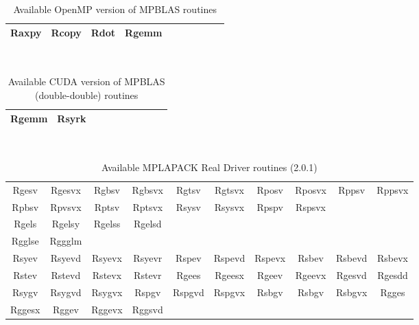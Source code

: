\documentclass[12pt]{article}
\begin{document}
\begin{table}
\caption{Available OpenMP version of MPBLAS routines}\label{mpblasroutinesopt}
\begin{center}
{\tt
\begin{tabular}{cccccccccc} \hline
Raxpy & Rcopy & Rdot & Rgemm \\ \hline
\end{tabular}
}
\end{center}
\end{table}

\begin{table}
\caption{Available CUDA version of MPBLAS (double-double) routines}\label{mpblasroutines_cuda_dd}
\begin{center}
{\tt
\begin{tabular}{cccccccccc} \hline
Rgemm & Rsyrk \\ \hline
\end{tabular}
}
\end{center}
\end{table}

\begin{table}
\caption{Available MPLAPACK Real Driver routines (2.0.1)}\label{mplapackdriver_real}
\begin{center}
{\tt
\begin{tabular}{cccccccccc} \hline
Rgesv  & Rgesvx & Rgbsv  & Rgbsvx & Rgtsv & Rgtsvx & Rposv  & Rposvx & Rppsv  & Rppsvx \\
Rpbsv  & Rpvsvx & Rptsv  & Rptsvx & Rsysv & Rsysvx & Rpspv  & Rspsvx \\ \hline %
Rgels  & Rgelsy & Rgelss & Rgelsd \\ \hline %
Rgglse & Rggglm \\ \hline %
Rsyev & Rsyevd & Rsyevx & Rsyevr & Rspev & Rspevd & Rspevx & Rsbev & Rsbevd & Rsbevx \\
Rstev & Rstevd & Rstevx & Rstevr & Rgees & Rgeesx & Rgeev & Rgeevx & Rgesvd & Rgesdd \\ \hline %
Rsygv & Rsygvd & Rsygvx & Rspgv & Rspgvd & Rspgvx & Rsbgv & Rsbgv & Rsbgvx & Rgges \\
Rggesx & Rggev & Rggevx & Rggsvd \\ \hline %
\end{tabular}
}
\end{center}
\end{table}
\end{document}
